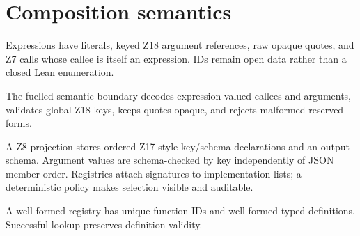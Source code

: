 \chapter{Composition semantics}\label{ch:semantics}

\begin{definition}\label{def:expr}
  \leanok
  Expressions have literals, keyed Z18 argument references, raw opaque quotes, and Z7 calls whose
  callee is itself an expression.  IDs remain open data rather than a closed Lean enumeration.
\end{definition}

\begin{definition}\label{def:expr-decode}
  \leanok
  The fuelled semantic boundary decodes expression-valued callees and arguments, validates global
  Z18 keys, keeps quotes opaque, and rejects malformed reserved forms.
\end{definition}

\begin{definition}\label{def:registry}
  \leanok
  A Z8 projection stores ordered Z17-style key/schema declarations and an output schema.
  Argument values are schema-checked by key independently of JSON member order.  Registries attach
  signatures to implementation lists; a deterministic policy makes selection visible and
  auditable.
\end{definition}

\begin{lemma}\label{lem:registry-valid}
  \leanok
  A well-formed registry has unique function IDs and well-formed typed definitions.  Successful
  lookup preserves definition validity.
\end{lemma}

